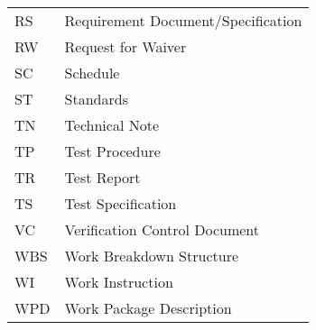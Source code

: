 \begin{tabular}{l l}
RS & Requirement Document/Specification \\
RW & Request for Waiver \\
SC & Schedule \\
ST & Standards \\
TN & Technical Note \\
TP & Test Procedure \\
TR & Test Report \\
TS & Test Specification \\
VC & Verification Control Document \\
WBS & Work Breakdown Structure \\
WI & Work Instruction \\
WPD & Work Package Description
\end{tabular}

